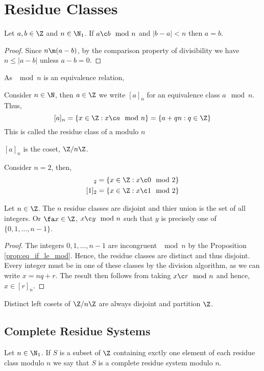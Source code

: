 
\section{Residue Classes}
\begin{nprop}\label{prop:eq_if_le_mod}
   Let $a, b \in \Z$ and $n \in \N_1$. If $a \c b \mod n$ and $|b - a| < n$ then $a = b$.
 \end{nprop}
\begin{proof}
  Since $n \m (a - b)$, by the comparison property of divisibility we have $n \le |a  - b|$ unless $a - b = 0$.
\end{proof}
As $\mod n$ is an equivalence relation,

\begin{ndefi}
  Consider $n \in \N$, then $a \in \Z$ we write $[a]_n$ for an equivalence class $a \mod n$. Thus,
  $$ [a]_n = \{x \in \Z : x \c a \mod n\} = \{a + qn : q \in \Z\} $$
  This is called the residue class of a modulo $n$
\end{ndefi}
$[a]_n$ is the coset, $\Z/n\Z$.

\begin{eg}
  Consider $n = 2$, then,
  \begin{align*}
    [0]_2 = \{x \in \Z : x \c 0 \mod 2\}\\
    [1]_2 = \{x \in \Z : x \c 1 \mod 2\}
  \end{align*}
\end{eg}

\begin{nprop}
   Let $n\in\Z$. The $n$ residue classes are disjoint and thier union is the set of all integers. Or $\fa x \in \Z$, $x \c y\mod n$ such that $y$ is precisely one of $\{0, 1, \dots, n - 1\}$.
 \end{nprop}
 \begin{proof}
   The integers $0, 1, \dots, n-1$ are incongruent $\mod n$ by the Proposition \ref{prop:eq_if_le_mod}. Hence, the residue classes are distinct and thus disjoint. Every integer must be in one of these classes by the division algorithm, as we can write $x = nq +r$. The result then follows from taking $x \c r \mod n$ and hence, $x \in [r]_n$.
 \end{proof}
 Distinct left cosets of $\Z/n\Z$ are always disjoint and partition $\Z$.

\subsection{Complete Residue Systems}
\begin{ndefi}
  Let $n \in \N_1$. If $S$ is a subset of $\Z$ containing exctly one element of each residue class modulo $n$ we say that $S$ is a complete residue system modulo $n$.
\end{ndefi}

